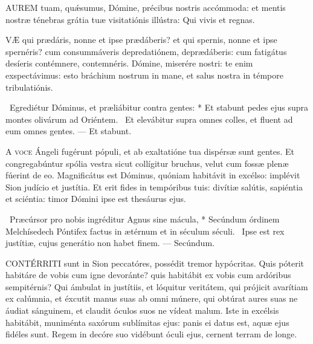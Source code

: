

\lettrine[lines=2]{A}{UREM} tuam, quǽsumus, Dómine, précibus nostris accómmoda: et mentis nostræ ténebras grátia tuæ visitatiónis illústra: Qui vivis et regnas.

\sectionornament




\lettrine[lines=2]{V}{Æ} qui prædáris, nonne et ipse prædáberis? et qui spernis, nonne et ipse spernéris? cum consummáveris depredatiónem, deprædáberis: cum fatigátus desíeris contémnere, contemnéris. Dómine, miserére nostri: te enim exspectávimus: esto bráchium nostrum in mane, et salus nostra in témpore tribulatiónis.

\R\ Egrediétur Dóminus, et præliábitur contra gentes: * Et stabunt pedes ejus supra montes olivárum ad Oriéntem. \V\ Et elevábitur supra omnes colles, et fluent ad eum omnes gentes. --- Et stabunt.


\lettrine[lines=2]{A}{} \textsc{voce} Ángeli fugérunt pópuli, et ab exaltatióne tua dispérsæ sunt gentes. Et congregabúntur spólia vestra sicut collígitur bruchus, velut cum fossæ plenæ fúerint de eo. Magnificátus est Dóminus, quóniam habitávit in excélso: implévit Sion judício et justítia. Et erit fides in tempóribus tuis: divítiæ salútis, sapiéntia et sciéntia: timor Dómini ipse est thesáurus ejus.

\R\ Præcúrsor pro nobis ingréditur Agnus sine mácula, * Secúndum órdinem Melchísedech Póntifex factus in ætérnum et in séculum séculi. \V\ Ipse est rex justítiæ, cujus generátio non habet finem. --- Secúndum.


\lettrine[lines=2]{C}{ONTÉRRITI} sunt in Sion peccatóres, possédit tremor hypócritas. Quis póterit habitáre de vobis cum igne devoránte? quis habitábit ex vobis cum ardóribus sempitérnis? Qui ámbulat in justítiis, et lóquitur veritátem, qui prójicit avarítiam ex calúmnia, et éxcutit manus suas ab omni múnere, qui obtúrat aures suas ne áudiat sánguinem, et claudit óculos suos ne vídeat malum. Iste in excélsis habitábit, muniménta saxórum sublímitas ejus: panis ei datus est, aquæ ejus fidéles sunt. Regem in decóre suo vidébunt óculi ejus, cernent terram de longe.

